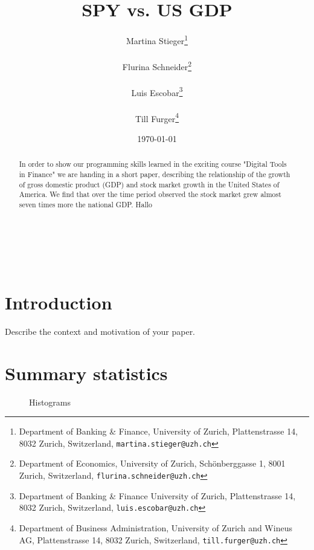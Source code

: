\documentclass{article}
\title{SPY vs. US GDP}
\author{
    
    Martina Stieger\thanks{Department of Banking \& Finance, University of Zurich, Plattenstrasse 14, 8032 Zurich, Switzerland, \tt{martina.stieger@uzh.ch}} \rule{0.5in}{0pt}

    Flurina Schneider\thanks{Department of Economics, University of Zurich, Schönberggasse 1, 8001 Zurich, Switzerland, \tt{flurina.schneider@uzh.ch}} \rule{0.5in}{0pt}
        
    Luis Escobar\thanks{Department of Banking \& Finance University of Zurich, Plattenstrasse 14, 8032 Zurich, Switzerland, \tt{luis.escobar@uzh.ch}} \rule{0.5in}{0pt}
    
    Till Furger\thanks{Department of Business Administration, University of Zurich and Wineus AG, Plattenstrasse 14, 8032 Zurich, Switzerland, \tt{till.furger@uzh.ch}}\\
    
    \small \date{\today}
}
\begin{document}

\maketitle

\begin{abstract} 
\noindent In order to show our programming skills learned in the exciting course "Digital Tools in Finance" we are
	handing in a short paper, describing the relationship of the growth of gross domestic product (GDP) and stock
	market growth in the United States of America. We find that over the time period observed the stock market grew
	almost seven times more the national GDP. Hallo
\end{abstract}

\hfill

\noindent{}\\
\noindent{}\\

\newpage


\tableofcontents
\listoffigures
\listoftables

\section{Introduction}
Describe the context and motivation of your paper.

\section{Summary statistics}

\begin{figure}[htbp]
	\centering
	
	\caption{Histograms}
\end{figure}
\end{document}
